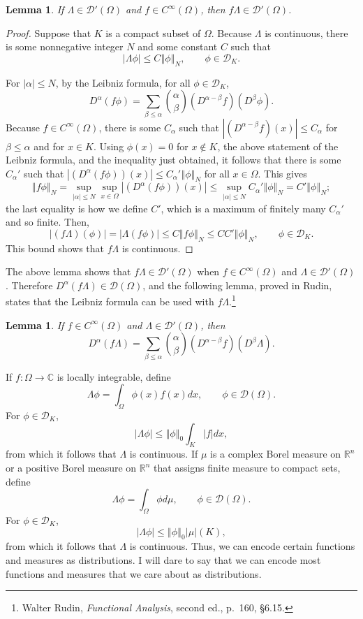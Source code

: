 \documentclass{article}
\newcommand{\norm}[1]{\left\Vert #1 \right\Vert}
\newtheorem{lemma}[theorem]{Lemma}
\theoremstyle{definition}
\begin{document}
\begin{lemma}
If $\Lambda \in \mathscr{D}'(\Omega)$ and $f \in C^\infty(\Omega)$, then $f \Lambda \in \mathscr{D}'(\Omega)$.
\label{module}
\end{lemma}
\begin{proof}
Suppose that $K$ is a compact subset of $\Omega$. Because $\Lambda$ is continuous, 
there is some nonnegative integer $N$ and some constant $C$ such that
\[
|\Lambda \phi| \leq C \norm{\phi}_N, \qquad \phi \in \mathscr{D}_K.
\]

For $|\alpha| \leq N$, by the Leibniz formula, for all
$\phi \in \mathscr{D}_K$,
\[
D^\alpha(f\phi) = \sum_{\beta \leq \alpha} \binom{\alpha}{\beta} (D^{\alpha-\beta}f)(D^\beta \phi).
\]
Because $f \in C^\infty(\Omega)$, there is some $C_{\alpha}$ such that $|(D^{\alpha-\beta}f)(x)| \leq C_{\alpha}$ for $\beta \leq \alpha$ and for $x \in K$. 
Using $\phi(x)=0$ for $x \not \in K$,  the above statement of the Leibniz formula, and  the inequality
just obtained,
it follows that there is some $C_{\alpha}'$ such that $|(D^\alpha(f\phi))(x)| \leq C_{\alpha}' \norm{\phi}_N$ for all $x \in \Omega$.
This gives
\[
\norm{f\phi}_N=\sup_{|\alpha| \leq N} \sup_{x \in \Omega} |(D^\alpha (f\phi))(x)|
\leq
\sup_{|\alpha| \leq N} C_{\alpha}' \norm{\phi}_N=C'\norm{\phi}_N;
\]
the last equality is how we define $C'$, which is a maximum of finitely many $C_\alpha'$ and so finite.
Then,
\[
|(f\Lambda)(\phi)| = |\Lambda(f\phi)| \leq C \norm{f\phi}_N \leq CC'\norm{\phi}_N, \qquad \phi \in \mathscr{D}_K.
\]
This bound shows that $f\Lambda$ is continuous.
\end{proof}

The above lemma shows that $f \Lambda \in \mathscr{D}'(\Omega)$ when $f \in C^\infty(\Omega)$ and $\Lambda \in \mathscr{D}'(\Omega)$.
Therefore $D^\alpha(f\Lambda) \in \mathscr{D}(\Omega)$, and the following lemma, proved in Rudin, states that the Leibniz formula can be used with $f\Lambda$.\footnote{Walter Rudin, {\em Functional Analysis}, second ed.,
p.~160, \S 6.15.}

\begin{lemma}
If $f \in C^\infty(\Omega)$ and $\Lambda \in \mathscr{D}'(\Omega)$, then 
\[
D^\alpha(f\Lambda) = \sum_{\beta \leq \alpha} \binom{\alpha}{\beta} (D^{\alpha-\beta}f)(D^\beta \Lambda).
\]
\label{leibniz}
\end{lemma}


If $f:\Omega \to \mathbb{C}$ is locally integrable,  define
\[
\Lambda \phi =\int_{\Omega} \phi(x) f(x) dx, \qquad \phi \in \mathscr{D}(\Omega).
\]
For $\phi \in \mathscr{D}_K$,
\[
|\Lambda \phi | \leq \norm{\phi}_0 \int_K |f| dx,
\]
from which it follows that $\Lambda$ is continuous. 
If $\mu$ is a complex Borel measure on $\mathbb{R}^n$ or a positive Borel measure on $\mathbb{R}^n$ that assigns finite measure to compact
sets,  define
\[
\Lambda \phi = \int_{\Omega} \phi d\mu, \qquad \phi \in \mathscr{D}(\Omega).
\]
For $\phi \in \mathscr{D}_K$,
\[
|\Lambda \phi| \leq \norm{\phi}_0 |\mu|(K),
\]
from which it follows that $\Lambda$ is continuous.
Thus, we can encode certain functions and measures as distributions. I will dare to say that we can encode most functions and measures
that we  care about as distributions.
\end{document}
